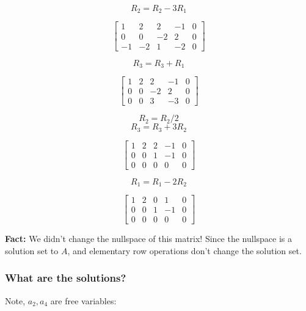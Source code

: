 \documentclass{article}
\newtheorem{one minute paper}[theorem]{One Minute Paper}
\begin{document}
\begin{equation}
    R_2 = R_2 - 3R_1
\end{equation}

\[\left[\begin{array}{cccc|c}
    1 & 2 & 2 & -1 & 0 \\
    0 & 0 & -2 & 2 & 0 \\
    -1 & -2 & 1 & -2 & 0
\end{array}\right]\]

\begin{equation}
    R_3 = R_3 + R_1
\end{equation}

\[\left[\begin{array}{cccc|c}
    1 & 2 & 2 & -1 & 0 \\
    0 & 0 & -2 & 2 & 0 \\
    0 & 0 & 3 & -3 & 0
\end{array}\right]\]

\begin{equation}
    R_2 = R_2/2
\end{equation}
\begin{equation}
    R_3 = R_3 + 3R_2
\end{equation}

\[\left[\begin{array}{cccc|c}
    1 & 2 & 2 & -1 & 0 \\
    0 & 0 & 1 & -1 & 0 \\
    0 & 0 & 0 & 0 & 0
\end{array}\right]\]

\begin{equation}
    R_1 = R_1 - 2R_2
\end{equation}

\[\left[\begin{array}{cccc|c}
    1 & 2 & 0 & 1 & 0 \\
    0 & 0 & 1 & -1 & 0 \\
    0 & 0 & 0 & 0 & 0
\end{array}\right]\]

\textbf{Fact:} We didn't change the nullspace of this matrix! Since the nullspace is a solution set to $A$, and elementary row operations don't change the solution set.

\subsubsection*{What are the solutions?}

Note, $a_2, a_4$ are free variables:
\end{document}
